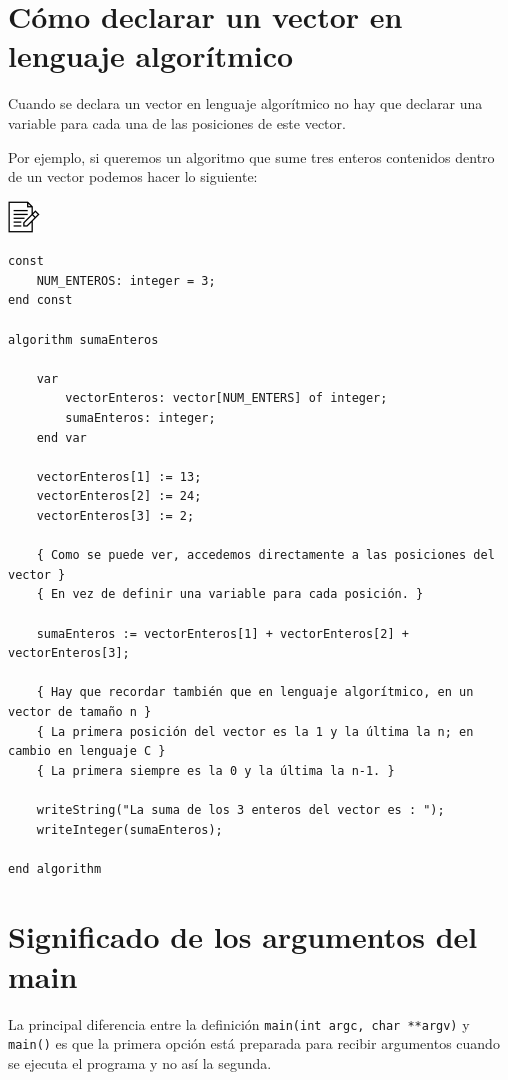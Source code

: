 \documentclass[
]{book}
\begin{document}
\hypertarget{cuxf3mo-declarar-un-vector-en-lenguaje-algoruxedtmico}{%
\section{Cómo declarar un vector en lenguaje algorítmico}\label{cuxf3mo-declarar-un-vector-en-lenguaje-algoruxedtmico}}

Cuando se declara un vector en lenguaje algorítmico no hay que declarar una variable para cada una de las posiciones de este vector.

Por ejemplo, si queremos un algoritmo que sume tres enteros contenidos dentro de un vector podemos hacer lo siguiente:

\includegraphics{./img/alg.png}

\begin{verbatim}
const
    NUM_ENTEROS: integer = 3;
end const

algorithm sumaEnteros

    var
        vectorEnteros: vector[NUM_ENTERS] of integer;
        sumaEnteros: integer;
    end var

    vectorEnteros[1] := 13;
    vectorEnteros[2] := 24;
    vectorEnteros[3] := 2;

    { Como se puede ver, accedemos directamente a las posiciones del vector }
    { En vez de definir una variable para cada posición. }

    sumaEnteros := vectorEnteros[1] + vectorEnteros[2] + vectorEnteros[3];

    { Hay que recordar también que en lenguaje algorítmico, en un vector de tamaño n }
    { La primera posición del vector es la 1 y la última la n; en cambio en lenguaje C }
    { La primera siempre es la 0 y la última la n-1. }

    writeString("La suma de los 3 enteros del vector es : ");
    writeInteger(sumaEnteros);

end algorithm
\end{verbatim}

\hypertarget{significado-de-los-argumentos-del-main}{%
\section{Significado de los argumentos del main}\label{significado-de-los-argumentos-del-main}}

La principal diferencia entre la definición \texttt{main(int\ argc,\ char\ **argv)} y \texttt{main()} es que la primera opción está preparada para recibir argumentos cuando se ejecuta el programa y no así la segunda.
\end{document}
